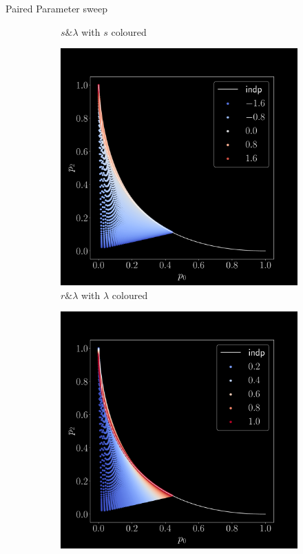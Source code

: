 \documentclass[aspectratio=169,9pt]{beamer}
\begin{document}
\begin{frame}{Paired Parameter sweep}
\begin{figure}[h]
\begin{adjustwidth}{-7cm}{-7cm}
\begin{subfigure}[b]{0.25\textwidth}
        \caption{$s \& \lambda$ with $s$ coloured}
      \end{subfigure}\pause
      \begin{subfigure}[b]{0.25\textwidth}
        \centering
        \includegraphics[width=\textwidth]{sweep-rl-l}
        \caption{$r \& \lambda$ with $\lambda$ coloured}
      \end{subfigure}
      \begin{subfigure}[b]{0.25\textwidth}
        \centering
        \includegraphics[width=\textwidth]{sweep-rl-r}

\end{subfigure}
\end{adjustwidth}
\end{figure}
\end{frame}
\end{document}
